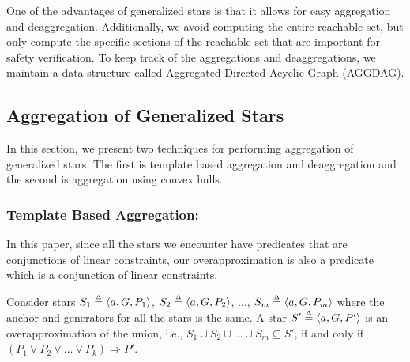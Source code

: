 One of the advantages of generalized stars is that it allows for easy aggregation and deaggregation. 
%
Additionally, we avoid computing the entire reachable set, but only compute the specific sections of the reachable set that are important for safety verification.
%
To keep track of the aggregations and deaggregations, we maintain a data structure called Aggregated Directed Acyclic Graph (AGGDAG).
%




\subsection{Aggregation of Generalized Stars}
\label{sec:aggStars}

In this section, we present two techniques for performing aggregation of generalized stars. The first is template based aggregation and deaggregation and the second is aggregation using convex hulls.
%


\subsubsection{Template Based Aggregation:}
\label{sec:templateAgg}
In this paper, since all the stars we encounter have predicates that are conjunctions of linear constraints, our overapproximation is also a predicate which is a conjunction of linear constraints.

\begin{lemma}
\label{lem:agg}
Consider stars $S_1 \deq \tup{a, G, P_1}$, $S_2 \deq \tup{a, G, P_2}$, $\ldots$, $S_m \deq \tup{a, G, P_m}$ where the anchor and generators for all the stars is the same.
%
A star $S' \deq \tup{a, G, P'}$ is an overapproximation of the union, i.e., $S_1 \cup S_2 \cup \ldots \cup S_m \subseteq S'$, if and only if $(P_1 \vee P_2 \vee \ldots \vee P_k) \Rightarrow P'$.
\end{lemma}

